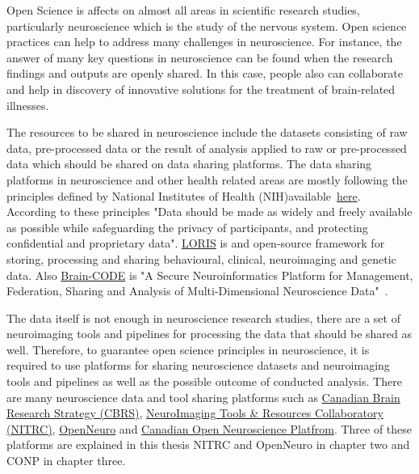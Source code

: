 Open Science is affects on almost all areas in scientific research studies, particularly neuroscience which is the study of the nervous system. Open science practices can help to address many challenges in neuroscience. For instance, the answer of many key questions in neuroscience can be found when the research findings and outputs are openly shared. In this case, people also can collaborate and help in discovery of innovative solutions for the treatment of brain-related illnesses. 

The resources to be shared in neuroscience include the datasets consisting of raw data, pre-processed data or the result of analysis applied to raw or pre-processed data which should be shared on data sharing platforms. The data sharing platforms in neuroscience and other health related areas are mostly following the principles defined by National Institutes of Health (NIH)available~\href{https://grants.nih.gov/grants/policy/data_sharing/data_sharing_guidance.htm}{here}. According to these principles "Data should be made as widely and freely available as possible while safeguarding the privacy of participants, and protecting confidential and proprietary data". \href{https://loris.ca/index.html}{LORIS} is and open-source framework for storing, processing and sharing behavioural, clinical, neuroimaging and genetic data. Also \href{https://www.braincode.ca/}{Brain-CODE} is "A Secure Neuroinformatics Platform for Management, Federation, Sharing and Analysis of Multi-Dimensional Neuroscience Data"~\cite{vaccarino2018brain}.



The data itself is not enough in neuroscience research studies, there are a set of neuroimaging tools and pipelines for processing the data that should be shared as well. Therefore, to guarantee open science principles in neuroscience, it is required to use platforms for sharing neuroscience datasets and neuroimaging tools and pipelines as well as the possible outcome of conducted analysis. There are many neuroscience data and tool sharing platforms such as \href{https://canadianbrain.ca/mission-vision/}{Canadian Brain Research Strategy (CBRS)}, \href{https://www.nitrc.org/}{NeuroImaging Tools \& Resources Collaboratory (NITRC)}, \href{https://openneuro.org/}{OpenNeuro} and \href{https://conp.ca/}{Canadian Open Neuroscience Platfrom}. Three of these platforms are explained in this thesis NITRC and OpenNeuro in chapter two and CONP in chapter three.



